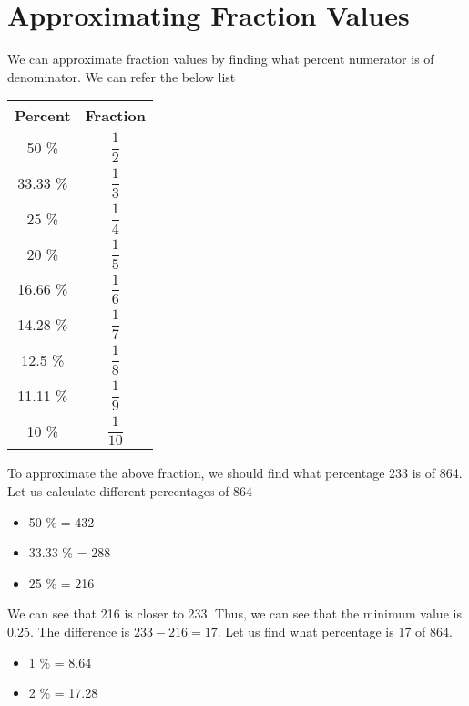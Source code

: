 \newpage






\section{Approximating Fraction Values}
We can approximate fraction values by finding what percent numerator is of denominator. We can refer the below list

\begin{table}[h!]
    \centering
    \begin{tabular}{|| c | c ||}
        \hline
         Percent & Fraction  \\
        \hline
         50 \% & $\dfrac{1}{2} $ \\[0.25cm]
         \hline
         33.33 \% & $\dfrac{1}{3} $ \\[0.25cm]
         \hline
         25 \% & $\dfrac{1}{4} $ \\[0.25cm]
         \hline
         20 \% & $\dfrac{1}{5} $ \\[0.25cm]
         \hline
         16.66 \% & $\dfrac{1}{6} $ \\[0.25cm]
         \hline
         14.28 \% & $\dfrac{1}{7} $ \\[0.25cm]
         \hline
         12.5 \% & $\dfrac{1}{8} $ \\[0.25cm]
         \hline
         11.11 \% & $\dfrac{1}{9} $ \\[0.25cm]
         \hline
         10 \% & $\dfrac{1}{10} $ \\[0.25cm]
         \hline
        \hline
    \end{tabular}
\end{table}


To approximate the above fraction, we should find what percentage 233 is of 864. Let us calculate different percentages of 864
\begin{itemize}
    \item 50 \% = 432
    \item 33.33 \% = 288
    \item 25 \% = 216
\end{itemize}

We can see that 216 is closer to 233. Thus, we can see that the minimum value is 0.25. The difference is $233 - 216 = 17$. Let us find what percentage is 17 of 864. 
\begin{itemize}
    \item 1 \% = 8.64
    \item 2 \% = 17.28
\end{itemize}

